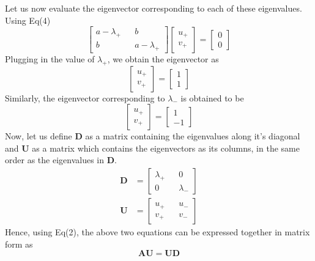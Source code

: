 \documentclass[11pt, oneside]{article}   	%
\begin{document}
Let us now evaluate the eigenvector corresponding to each of these eigenvalues. Using Eq(4)
\begin{equation}
\begin{bmatrix}
a-\lambda_+ && b\\
b && a-\lambda_+
\end{bmatrix} \begin{bmatrix}
u_+ \\ v_+
\end{bmatrix} = \begin{bmatrix}
0 \\ 0
\end{bmatrix}
\end{equation}
Plugging in the value of $\lambda_+$, we obtain the eigenvector as
\begin{equation}
\begin{bmatrix}
u_+ \\ v_+
\end{bmatrix}= \begin{bmatrix}
1 \\ 1
\end{bmatrix}
\end{equation}
Similarly, the eigenvector corresponding to $\lambda_-$ is obtained to be
\begin{equation}
\begin{bmatrix}
u_+ \\ v_+
\end{bmatrix}= \begin{bmatrix}
1 \\ -1
\end{bmatrix}
\end{equation}
Now, let us define \textbf{D} as a matrix containing the eigenvalues along it's diagonal and \textbf{U} as a matrix which contains the eigenvectors as its columns, in the same order as the eigenvalues in \textbf{D}.
\begin{align}
\boldsymbol{D} &= \begin{bmatrix}
\lambda_+ && 0 \\
0 && \lambda_-
\end{bmatrix} \\
\boldsymbol{U} &= \begin{bmatrix}
u_+ && u_- \\
v_+ && v_-
\end{bmatrix}
\end{align}
Hence, using Eq(2), the above two equations can be expressed together in matrix form as
\begin{equation}
\boldsymbol{A} \boldsymbol{U} = \boldsymbol{U} \boldsymbol{D}
\end{equation}
\end{document}
